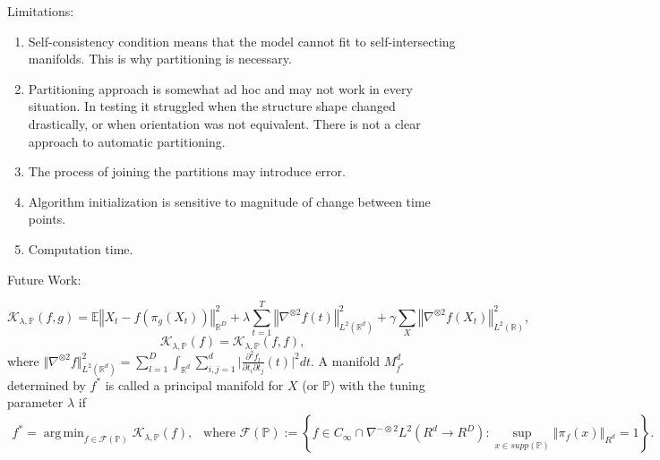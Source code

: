 \documentclass[11pt,reqno]{article}
\DeclareMathOperator*{\argmin}{arg\,min}
\begin{document}
Limitations:
\begin{enumerate}
  \item Self-consistency condition means that the model cannot fit to self-intersecting manifolds. This is why partitioning is necessary.
  \item Partitioning approach is somewhat ad hoc and may not work in every situation. In testing it struggled when the structure shape changed drastically, or when orientation was not equivalent. There is not a clear approach to automatic partitioning.
  \item The process of joining the partitions may introduce error.
  \item Algorithm initialization is sensitive to magnitude of change between time points.
  \item Computation time.
\end{enumerate}

Future Work:

\LinesNumbered


	\begin{equation}\label{PMSEF}
	\mathcal{K}_{\lambda,\mathbb{P}}(f,g)=\mathbb{E}\left\Vert X_t - f\left(\pi_g(X_t)\right)\right\Vert^2_{\mathbb{R}^D} + \lambda \sum_{t = 1}^T \left\Vert\nabla^{\otimes 2} f(t)\right\Vert_{L^2(\mathbb{R}^d)}^2 + \gamma \sum_{X} \left\Vert\nabla^{\otimes 2} f(X_t)\right\Vert_{L^2(\mathbb{R})}^2, 
	\end{equation}
	\begin{equation}\nonumber
	\mathcal{K}_{\lambda,\mathbb{P}}(f)=\mathcal{K}_{\lambda,\mathbb{P}}(f,f),
	\end{equation}
	where $\Vert\nabla^{\otimes 2}f \Vert_{L^2(\mathbb{R}^d)}^2 = \sum_{l=1}^D\int_{\mathbb{R}^d} \sum_{i,j=1}^d\vert\frac{\partial^2 f_l}{\partial t_i \partial t_j}(t)\vert^2dt$. A manifold $M_{f^*}^d$ determined by $f^*$ is called a principal manifold for $X$ (or $\mathbb{P}$) with the tuning parameter $\lambda$ if 
	\begin{align}\label{def: PM}
	f^*=\argmin_{f\in\mathscr{F}(\mathbb{P})}\mathcal{K}_{\lambda,\mathbb{P}}(f),\ \ \mbox{ where }\mathscr{F}(\mathbb{P}):=\left\{f\in C_\infty\cap \nabla^{-\otimes 2}L^2( R^d \rightarrow R^D):\sup_{x\in supp(\mathbb{P})}\left\Vert\pi_f(x)\right\Vert_{R^d} = 1 \right\}.
	\end{align}
\end{document}
